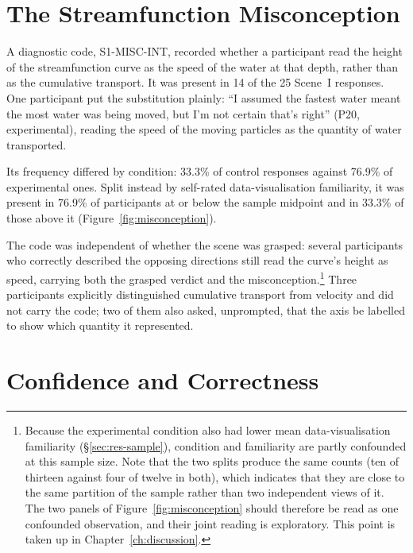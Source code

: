 \section{The Streamfunction Misconception}
\label{sec:res-misconception}

A diagnostic code, S1-MISC-INT, recorded whether a participant read the height of the streamfunction curve as the speed of the water at that depth, rather than as the cumulative transport. It was present in 14 of the 25 Scene~I responses. One participant put the substitution plainly: ``I assumed the fastest water meant the most water was being moved, but I'm not certain that's right'' (P20, experimental), reading the speed of the moving particles as the quantity of water transported.

Its frequency differed by condition: 33.3\% of control responses against 76.9\% of experimental ones. Split instead by self-rated data-visualisation familiarity, it was present in 76.9\% of participants at or below the sample midpoint and in 33.3\% of those above it (Figure~\ref{fig:misconception}).

The code was independent of whether the scene was grasped: several participants who correctly described the opposing directions still read the curve's height as speed, carrying both the grasped verdict and the misconception.\footnote{Because the experimental condition also had lower mean data-visualisation familiarity (\S\ref{sec:res-sample}), condition and familiarity are partly confounded at this sample size. Note that the two splits produce the same counts (ten of thirteen against four of twelve in both), which indicates that they are close to the same partition of the sample rather than two independent views of it. The two panels of Figure~\ref{fig:misconception} should therefore be read as one confounded observation, and their joint reading is exploratory. This point is taken up in Chapter~\ref{ch:discussion}.} Three participants explicitly distinguished cumulative transport from velocity and did not carry the code; two of them also asked, unprompted, that the axis be labelled to show which quantity it represented.

\section{Confidence and Correctness}
\label{sec:res-confidence}

